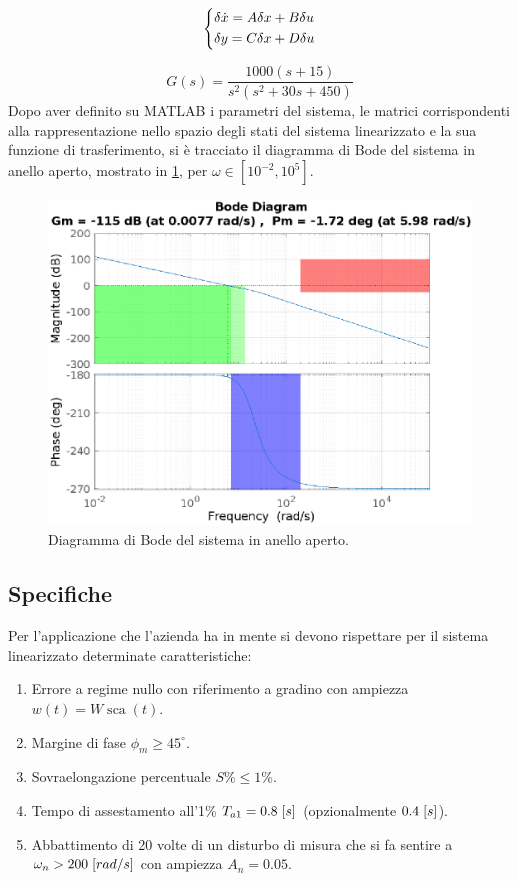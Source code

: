 \documentclass[a4paper]{article}
\newenvironment{eqsys}{\begin{equation}\begin{dcases}}{\end{dcases}\end{equation}}
\DeclareMathOperator*{\sca}{\textrm{sca}}
\begin{document}
\begin{eqsys}
\label{eqn:linearized}
\delta \dot{x} = A \delta x + B \delta u\\
\delta y = C \delta x + D \delta u
\end{eqsys}




\begin{equation}
    \label{eqn:G}
    G(s) = \frac{1000 (s+15)}{s^2 (s^2 + 30s + 450)}
\end{equation}
Dopo aver definito su MATLAB i parametri del sistema, le matrici corrispondenti alla rappresentazione nello spazio degli stati del sistema linearizzato e la sua funzione di trasferimento, si è tracciato il diagramma di Bode del sistema in anello aperto, mostrato in \cref{fig:bode_G}, per $\omega \in [10^{-2}, 10^5]$.

\begin{figure}[h!]
    \centering
    \includegraphics[width=\textwidth]{bode_G}
    \caption{Diagramma di Bode del sistema in anello aperto.}
    \label{fig:bode_G}
\end{figure}

\subsection{Specifiche}
Per l’applicazione che l’azienda ha in mente si devono rispettare per il sistema linearizzato determinate caratteristiche:
\begin{enumerate}
    \item Errore a regime nullo con riferimento a gradino con ampiezza $w(t) = W \sca(t)$.
    \item Margine di fase $\phi_m \geq 45^\circ$.
    \item Sovraelongazione percentuale $S\% \leq 1\%$.
    \item Tempo di assestamento all'1\% $T_{a1} = 0.8\hspace{0.3em} [s]$ (opzionalmente $0.4 \hspace{0.3em}[s]$).
    \item Abbattimento di 20 volte di un disturbo di misura che si fa sentire a $\omega_n > 200\hspace{0.3em} [rad/s]$ con ampiezza $A_n = 0.05$.
\end{enumerate}
\end{document}

